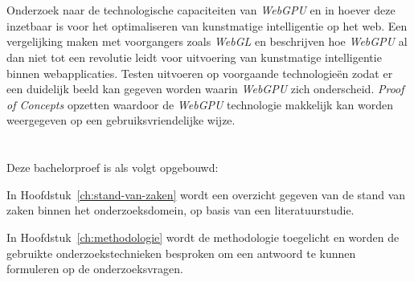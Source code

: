 \section{}%
\label{sec:onderzoeksdoelstelling}


\iffalse
TODO Dit moet verder uitgewerkt worden, zodat de samenhang verbetert. Maak er een langere tekst van.
\fi

Onderzoek naar de technologische capaciteiten van \textit{WebGPU} en in hoever deze inzetbaar is voor het optimaliseren van kunstmatige intelligentie op het web. Een vergelijking maken met voorgangers zoals \textit{WebGL} en beschrijven hoe \textit{WebGPU} al dan niet tot een revolutie leidt voor uitvoering van kunstmatige intelligentie binnen web\-app\-li\-ca\-ties. Testen uitvoeren op voorgaande technologieën zodat er een duidelijk beeld kan gegeven worden waarin \textit{WebGPU} zich onderscheid. \textit{Proof of Concepts} opzetten waardoor de \textit{WebGPU} technologie makkelijk kan worden weergegeven op een gebruiksvriendelijke wijze.

\section{}%
\label{sec:opzet-bachelorproef}


Deze bachelorproef is als volgt opgebouwd:

\bigbreak{}

In Hoofdstuk~\ref{ch:stand-van-zaken} wordt een overzicht gegeven van de stand van zaken binnen het onderzoeksdomein, op basis van een literatuurstudie.

\bigbreak{}

In Hoofdstuk~\ref{ch:methodologie} wordt de methodologie toegelicht en worden de gebruikte onderzoekstechnieken besproken om een antwoord te kunnen formuleren op de onderzoeksvragen.

